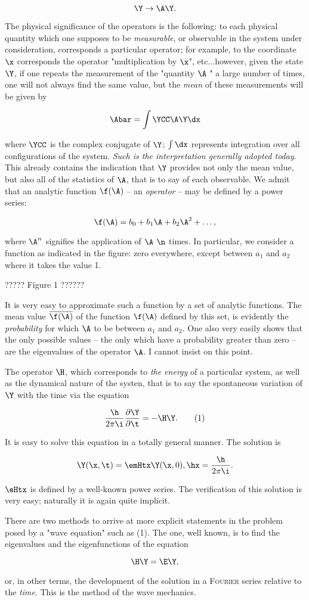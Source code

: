 \documentclass{article}
\newcommand{\nequ}[2]{
\begin{equation*}
#1
\tag{#2}
\end{equation*}
}
\newcommand{\uequ}[1]{
\begin{equation*}
#1
\end{equation*}
}
\newcommand{\var}[1]{#1}
\newcommand{\const}[1]{#1}
\newcommand{\pddt}[1]{\pdXdY{#1}{\t}}
\newcommand{\pdXdY}[2]{
\frac{\partial {#1}}{\partial {#2}}
}
\newcommand{\barred}[1]{
\overline{#1}
}
\renewcommand{\it}[1]{\textit{#1}}
\renewcommand{\sc}[1]{\textsc{#1}}
\newcommand{\bX}[1]{\var{b_{#1}}}
\renewcommand{\a}[1]{\const{a}_{#1}}
\begin{document}
\uequ{
\Y \rightarrow \A\Y.
}

The physical significance of the operators is the following: to each physical quantity which one supposes to be \it{measurable}, or observable in the system under consideration, corresponds a particular operator; for example, to the coordinate $\x$ corresponds the operator "multiplication by $\x$", etc...however, given the state $\Y$, if one repeats the measurement of the "quantity $\A$
" a large number of times, one will not always find the same value, but the \it{mean} of these measurements will be given by

\uequ{
\Abar = \int\YCC\A\Y\dx
}
where $\YCC$ is the complex conjugate of $\Y$; $\int\dx$ represents integration over all configurations of the system. \it{Such is the interpretation generally adopted today}. This already contains the indication that $\Y$ provides not only the mean value, but also all of the statistics of $\A$, that is to say of each observable. We admit that an analytic function $\f(\A)$ -- an \it{operator} -- may be defined by a power series:

\uequ{
\f(\A) = \bX{0} + \bX{1}\A + \bX{2}\A^2 + \dots,
}
where $\A^n$ signifies the application of $\A$ $\n$ times.
In particular, we consider a function as indicated in the figure: zero everywhere, except between $\a{1}$ and $\a{2}$ where it takes the value 1.


????? Figure 1 ??????


It is very easy to approximate such a function by a set of analytic functions. The mean value $\barred{\f(\A)}$ of the function $\f(\A)$ defined by this set, is evidently the \it{probability} for which $\A$ to be between $\a{1}$ and $\a{2}$. One also very easily shows that the only possible values -- the only which have a probability greater than zero -- are the eigenvalues of the operator $\A$. I cannot insist on this point.

The operator $\H$, which corresponds to \it{the energy} of a particular system, as well as the dynamical nature of the systen, that is to say the spontaneous variation of $\Y$ with the time via the equation
\nequ{
\frac{\h}{2\pi\i}\pddt{\Y} = -\H\Y.
}{1}
It is easy to solve this equation in a totally general manner. The solution is
\uequ{
\Y(\x, \t) = \emHtx\Y(\x, 0), \hx = \frac{\h}{2\pi\i}.
}
$\eHtx$ is defined by a well-known power series. The verification of this solution is very easy; naturally it is again quite implicit.

There are two methods to arrive at more explicit statements in the problem posed by a "wave equation" such as (1). The one, well known, is to find the eigenvalues and the eigenfunctions of the equation
\uequ{
\H\Y = \E\Y,
}
or, in other terms, the development of the solution in a \sc{Fourier} series relative to the \it{time}. This is the method of the wave mechanics.
\end{document}
